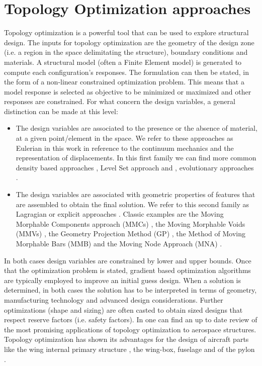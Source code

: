\section*{Topology Optimization approaches}
 Topology optimization is a powerful tool that can be used to explore structural design. The inputs for topology optimization are the geometry of the design zone (i.e. a region in the space delimitating the structure), boundary conditions and materials. A structural model (often a Finite Element model) is generated to compute each configuration's responses. 
The formulation can then be stated, in the form of a non-linear constrained optimization problem. This means that a model response is selected as objective to be minimized or maximized and other responses are constrained.
For what concern the design variables, a general distinction can be made at this level:
\begin{itemize}
\item The design variables are associated to the presence or the absence of material, at a given point/element in the space. We refer to these approaches as Eulerian in this work \cite{zhang2016lagrangian} in reference to the continuum mechanics and the representation of displacements. In this first family we can find more common density based approaches \cite{bendsoe1989optimal,zhou1991coc,bendsoe1995optimization},  Level Set approach \cite{wang2003level,allaire2004structural} and ,  evolutionary approaches \cite{xie1993simple,xia2018bi}. 
\item The design variables are associated with geometric properties of features that are assembled to obtain the final solution. We refer to this second family as Lagragian or explicit approaches \cite{zhang2016lagrangian}. Classic examples are the Moving Morphable Components approach (MMCs) \cite{guo2014doing,guo2016explicit,zhang2016new,zhang2017new}, the Moving Morphable Voids (MMVs) \cite{zhang2017explicit}, the Geometry Projection Method (GP) \cite{bell2012geometry,norato2015geometryde,zhang2016geometry}, the Method of Moving Morphable
Bars (MMB) \cite{hoang2017topology} and  the Moving Node Approach (MNA) \cite{overvelde2012moving}. 
\end{itemize}
In both cases design variables are constrained by lower and upper bounds. Once that the optimization problem is stated, gradient based optimization algorithms are typically employed to improve an initial guess design. When a solution is determined, in both cases the solution has to be interpreted in terms of geometry, manufacturing technology and advanced design considerations. Further optimizations (shape and sizing) are often casted to obtain sized designs that respect reserve factors (i.e. safety factors). In \cite{zhu2016topology} one can find an up to date review of the most promising applications of topology optimization to aerospace structures. Topology optimization has shown its advantages for the design of aircraft parts like the wing internal primary structure \cite{eves2009topology,aage2017giga}, the wing-box, fuselage \cite{niemann2013use,singh2016topology} and of the pylon \cite{remouchamps2011application,xue2012structural}.  
